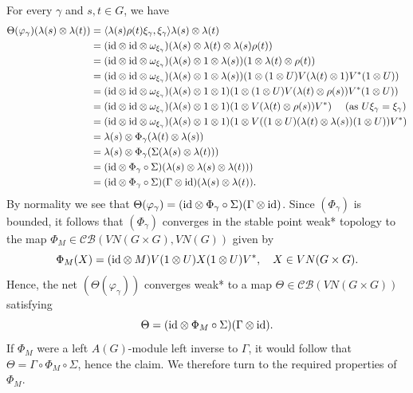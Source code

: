 \documentclass[preprint,12pt]{elsarticle}
\newcommand{\mc}[1]{\mathcal{#1}}
\newcommand{\la}{\langle}
\newcommand{\ra}{\rangle}
\newcommand{\vphi}{\varphi}
\newcommand{\lm}{\lambda}
\newcommand{\Gam}{\Gamma}
\newcommand{\om}{\omega}
\newcommand{\ten}{\otimes}
\newcommand{\id}{\textnormal{id}}
\begin{document}
\begin{pf}
For every $\gamma$ and $s,t\in G$, we have
\begin{align*}\Theta(\vphi_\gamma)(\lm(s)\ten\lm(t))&=\la\lm(s)\rho(t)\xi_\gamma,\xi_\gamma\ra\lm(s)\ten\lm(t)\\
&=(\id\ten\id\ten\om_{\xi_\gamma})(\lm(s)\ten\lm(t)\ten\lm(s)\rho(t))\\
&=(\id\ten\id\ten\om_{\xi_\gamma})(\lm(s)\ten1\ten\lm(s))(1\ten\lm(t)\ten\rho(t))\\
&=(\id\ten\id\ten\om_{\xi_\gamma})(\lm(s)\ten1\ten\lm(s))(1\ten(1\ten U)V(\lm(t)\ten 1)V^*(1\ten U))\\
&=(\id\ten\id\ten\om_{\xi_\gamma})(\lm(s)\ten1\ten1)(1\ten(1\ten U)V(\lm(t)\ten\rho(s))V^*(1\ten U))\\
&=(\id\ten\id\ten\om_{\xi_\gamma})(\lm(s)\ten1\ten1)(1\ten V(\lm(t)\ten\rho(s))V^*) \ \ \ \ (\textnormal{as $U\xi_\gamma=\xi_\gamma$})\\
&=(\id\ten\id\ten\om_{\xi_\gamma})(\lm(s)\ten1\ten1)(1\ten V((1\ten U)(\lm(t)\ten\lm(s))(1\ten U))V^*)\\
&=\lm(s)\ten\Phi_\gamma(\lm(t)\ten\lm(s))\\
&=\lm(s)\ten\Phi_\gamma(\Sigma(\lm(s)\ten\lm(t)))\\
&=(\id\ten\Phi_\gamma\circ\Sigma)(\lm(s)\ten\lm(s)\ten\lm(t)))\\
&=(\id\ten\Phi_\gamma\circ\Sigma)(\Gam\ten\id)(\lm(s)\ten\lm(t)).\end{align*}
By normality we see that $\Theta(\vphi_\gamma)=(\id\ten\Phi_\gamma\circ\Sigma)(\Gam\ten\id)$. Since $(\Phi_\gamma)$ is bounded, it follows that $(\Phi_\gamma)$ converges in the stable point weak* topology to the map $\Phi_M\in\mc{CB}(VN(G\times G),VN(G))$ given by
$$\Phi_M(X)=(\id\ten M)V(1\ten U)X(1\ten U)V^*, \ \ \ X\in VN(G\times G).$$
Hence, the net $(\Theta(\vphi_\gamma))$ converges weak* to a map $\Theta\in\mc{CB}(VN(G\times G))$ satisfying $$\Theta=(\id\ten\Phi_M\circ\Sigma)(\Gam\ten\id).$$
If $\Phi_M$ were a left $A(G)$-module left inverse to $\Gam$, it would follow that $\Theta=\Gam\circ\Phi_M\circ\Sigma$, hence the claim. We therefore turn to the required properties of $\Phi_M$.


\end{pf}
\end{document}
